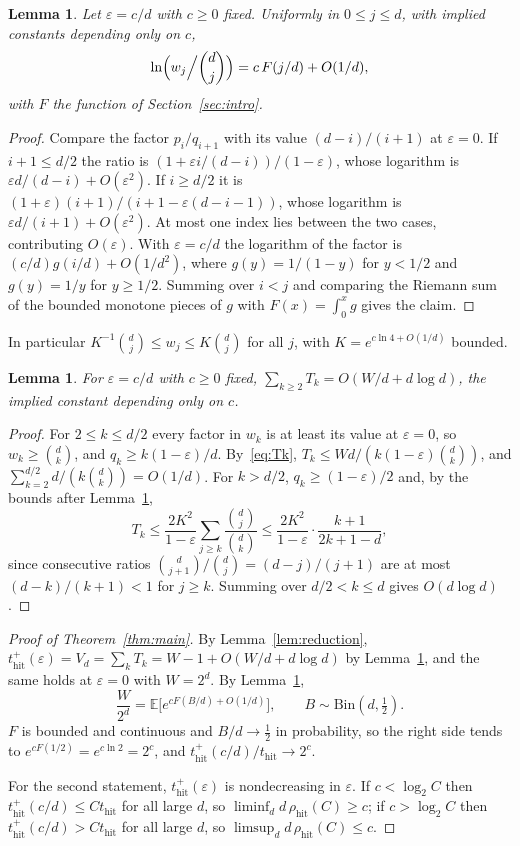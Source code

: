 \documentclass[11pt]{amsart}
\newtheorem{lemma}[theorem]{Lemma}
\theoremstyle{remark}
\newcommand{\eps}{\varepsilon}
\newcommand{\E}{\mathbb{E}}
\newcommand{\thit}{t_{\mathrm{hit}}}
\newcommand{\rhit}{\rho_{\mathrm{hit}}}
\begin{document}
\begin{lemma}\label{lem:weights}
Let $\eps=c/d$ with $c\ge0$ fixed. Uniformly in $0\le j\le d$, with implied constants depending only on $c$,
\[
\ln\Bigl(w_j\Big/\binom dj\Bigr)=c\,F(j/d)+O(1/d),
\]
with $F$ the function of Section~\ref{sec:intro}.
\end{lemma}

\begin{proof}
Compare the factor $p_i/q_{i+1}$ with its value $(d-i)/(i+1)$ at $\eps=0$. If $i+1\le d/2$ the ratio is
$(1+\eps i/(d-i))/(1-\eps)$, whose logarithm is $\eps d/(d-i)+O(\eps^2)$. If $i\ge d/2$ it is
$(1+\eps)(i+1)/(i+1-\eps(d-i-1))$, whose logarithm is $\eps d/(i+1)+O(\eps^2)$. At most one index lies between the
two cases, contributing $O(\eps)$. With $\eps=c/d$ the logarithm of the factor is $(c/d)g(i/d)+O(1/d^2)$, where
$g(y)=1/(1-y)$ for $y<1/2$ and $g(y)=1/y$ for $y\ge1/2$. Summing over $i<j$ and comparing the Riemann sum of the
bounded monotone pieces of $g$ with $F(x)=\int_0^xg$ gives the claim.
\end{proof}

In particular $K^{-1}\binom dj\le w_j\le K\binom dj$ for all $j$, with $K=e^{c\ln4+O(1/d)}$ bounded.

\begin{lemma}\label{lem:tail}
For $\eps=c/d$ with $c\ge0$ fixed, $\sum_{k\ge2}T_k=O(W/d+d\log d)$, the implied constant depending only on $c$.
\end{lemma}

\begin{proof}
For $2\le k\le d/2$ every factor in $w_k$ is at least its value at $\eps=0$, so $w_k\ge\binom dk$, and
$q_k\ge k(1-\eps)/d$. By~\eqref{eq:Tk}, $T_k\le Wd/(k(1-\eps)\binom dk)$, and
$\sum_{k=2}^{d/2}d/(k\binom dk)=O(1/d)$. For $k>d/2$, $q_k\ge(1-\eps)/2$ and, by the bounds after
Lemma~\ref{lem:weights},
\[
T_k\le\frac{2K^2}{1-\eps}\sum_{j\ge k}\frac{\binom dj}{\binom dk}\le\frac{2K^2}{1-\eps}\cdot\frac{k+1}{2k+1-d},
\]
since consecutive ratios $\binom d{j+1}/\binom dj=(d-j)/(j+1)$ are at most $(d-k)/(k+1)<1$ for $j\ge k$. Summing over
$d/2<k\le d$ gives $O(d\log d)$.
\end{proof}

\begin{proof}[Proof of Theorem~\ref{thm:main}]
By Lemma~\ref{lem:reduction}, $\thit^+(\eps)=V_d=\sum_kT_k=W-1+O(W/d+d\log d)$ by Lemma~\ref{lem:tail}, and the same
holds at $\eps=0$ with $W=2^d$. By Lemma~\ref{lem:weights},
\[
\frac{W}{2^d}=\E\bigl[e^{cF(B/d)+O(1/d)}\bigr],\qquad B\sim\mathrm{Bin}(d,\tfrac12).
\]
$F$ is bounded and continuous and $B/d\to\frac12$ in probability, so the right side tends to $e^{cF(1/2)}=e^{c\ln2}=
2^c$, and $\thit^+(c/d)/\thit\to2^c$.

For the second statement, $\thit^+(\eps)$ is nondecreasing in $\eps$. If $c<\log_2C$ then $\thit^+(c/d)\le C\thit$ for
all large $d$, so $\liminf_d d\,\rhit(C)\ge c$; if $c>\log_2C$ then $\thit^+(c/d)>C\thit$ for all large $d$, so
$\limsup_d d\,\rhit(C)\le c$.
\end{proof}
\end{document}
